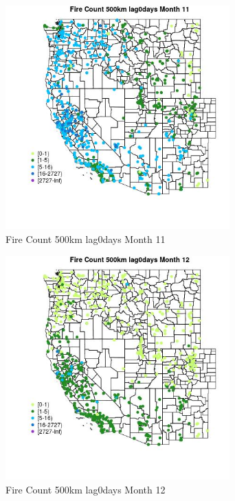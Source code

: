 \begin{figure} 
\centering  
\includegraphics[width=0.77\textwidth]{Code_Outputs/Report_ML_input_PM25_Step4_part_f_de_duplicated_aveswNAs_MapObsMo11Fire_Count_500km_lag0days.jpg} 
\caption{\label{fig:Report_ML_input_PM25_Step4_part_f_de_duplicated_aveswNAsMapObsMo11Fire_Count_500km_lag0days}Fire Count 500km lag0days Month 11} 
\end{figure} 
 

\clearpage 

\begin{figure} 
\centering  
\includegraphics[width=0.77\textwidth]{Code_Outputs/Report_ML_input_PM25_Step4_part_f_de_duplicated_aveswNAs_MapObsMo12Fire_Count_500km_lag0days.jpg} 
\caption{\label{fig:Report_ML_input_PM25_Step4_part_f_de_duplicated_aveswNAsMapObsMo12Fire_Count_500km_lag0days}Fire Count 500km lag0days Month 12} 
\end{figure} 
 

